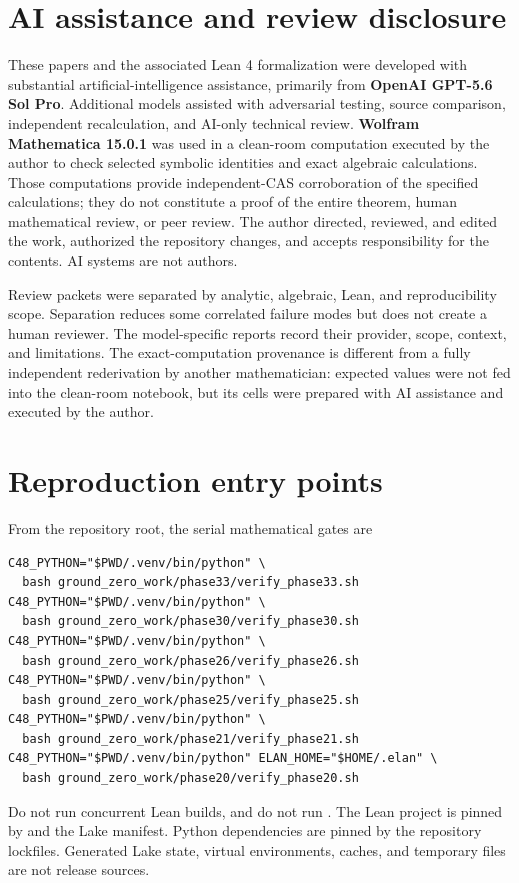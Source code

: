 \documentclass[10pt]{article}
\begin{document}
\section{AI assistance and review disclosure}\label{sup:disclosure}

These papers and the associated Lean 4 formalization were developed with
substantial artificial-intelligence assistance, primarily from
\textbf{OpenAI GPT-5.6 Sol Pro}.  Additional models assisted with adversarial
testing, source comparison, independent recalculation, and AI-only technical
review.  \textbf{Wolfram Mathematica 15.0.1} was used in a clean-room
computation executed by the author to check selected symbolic identities and
exact algebraic calculations.  Those computations provide independent-CAS
corroboration of the specified calculations; they do not constitute a proof
of the entire theorem, human mathematical review, or peer review.  The author
directed, reviewed, and edited the work, authorized the repository changes,
and accepts responsibility for the contents.  AI systems are not authors.

Review packets were separated by analytic, algebraic, Lean, and
reproducibility scope.  Separation reduces some correlated failure modes but
does not create a human reviewer.  The model-specific reports record their
provider, scope, context, and limitations.  The exact-computation provenance
is different from a fully independent rederivation by another mathematician:
expected values were not fed into the clean-room notebook, but its cells were
prepared with AI assistance and executed by the author.


\section{Reproduction entry points}\label{sup:reproduction}

From the repository root, the serial mathematical gates are
\begin{verbatim}
C48_PYTHON="$PWD/.venv/bin/python" \
  bash ground_zero_work/phase33/verify_phase33.sh
C48_PYTHON="$PWD/.venv/bin/python" \
  bash ground_zero_work/phase30/verify_phase30.sh
C48_PYTHON="$PWD/.venv/bin/python" \
  bash ground_zero_work/phase26/verify_phase26.sh
C48_PYTHON="$PWD/.venv/bin/python" \
  bash ground_zero_work/phase25/verify_phase25.sh
C48_PYTHON="$PWD/.venv/bin/python" \
  bash ground_zero_work/phase21/verify_phase21.sh
C48_PYTHON="$PWD/.venv/bin/python" ELAN_HOME="$HOME/.elan" \
  bash ground_zero_work/phase20/verify_phase20.sh
\end{verbatim}
Do not run concurrent Lean builds, and do not run .  The
Lean project is pinned by  and the Lake manifest.
Python dependencies are pinned by the repository lockfiles.  Generated Lake
state, virtual environments, caches, and temporary files are not release
sources.
\end{document}
